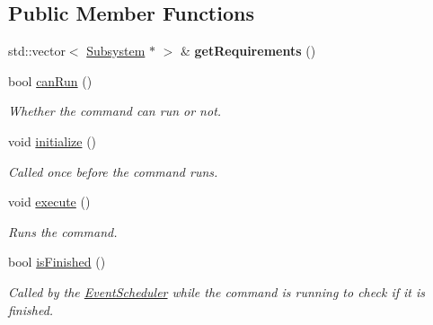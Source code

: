 \subsection*{Public Member Functions}
\begin{DoxyCompactItemize}
\item 
\mbox{\label{classlib_iterative_robot_1_1_command_group_abf3d539920648f9dec9dfdef30699c82}} 
std\+::vector$<$ \mbox{\hyperlink{classlib_iterative_robot_1_1_subsystem}{Subsystem}} $\ast$ $>$ \& {\bfseries get\+Requirements} ()
\item 
bool \mbox{\hyperlink{classlib_iterative_robot_1_1_command_group_abd75c9b52e6b4ae5af1b6724e865311f}{can\+Run}} ()
\begin{DoxyCompactList}\small\item\em Whether the command can run or not. \end{DoxyCompactList}\item 
void \mbox{\hyperlink{classlib_iterative_robot_1_1_command_group_a99800c5dbd05ab750aa0bb27518d0467}{initialize}} ()
\begin{DoxyCompactList}\small\item\em Called once before the command runs. \end{DoxyCompactList}\item 
\mbox{\label{classlib_iterative_robot_1_1_command_group_a5e91d370cafde43548d79945ccb4d8fe}} 
void \mbox{\hyperlink{classlib_iterative_robot_1_1_command_group_a5e91d370cafde43548d79945ccb4d8fe}{execute}} ()
\begin{DoxyCompactList}\small\item\em Runs the command. \end{DoxyCompactList}\item 
bool \mbox{\hyperlink{classlib_iterative_robot_1_1_command_group_a96807a2763adf9e21ebf2cb9e3574e3c}{is\+Finished}} ()
\begin{DoxyCompactList}\small\item\em Called by the \mbox{\hyperlink{classlib_iterative_robot_1_1_event_scheduler}{Event\+Scheduler}} while the command is running to check if it is finished. \end{DoxyCompactList}\item 
\mbox{\label{classlib_iterative_robot_1_1_command_group_a28ad3a1c2f6b4f9aea10efa1a824895e}} 

\end{DoxyCompactItemize}
